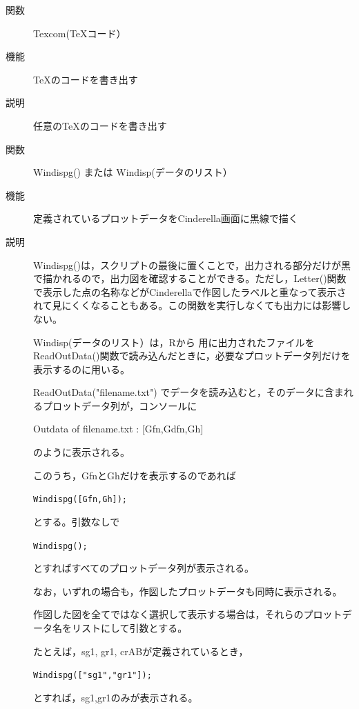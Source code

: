 \documentclass[papersize,a4paper,12pt,uplatex]{jsarticle}
\begin{document}
\begin{description}
\vspace{\baselineskip}
\hypertarget{texcom}{}
\item[関数]  Texcom(\TeX コード）
\item[機能]  \TeX のコードを書き出す
\item[説明]  任意の\TeX のコードを書き出す

\vspace{\baselineskip}
\hypertarget{windispg}{}
\item[関数]  Windispg()  または  Windisp(データのリスト）
\item[機能]  定義されているプロットデータをCinderella画面に黒線で描く
\item[説明]  Windispg()は，スクリプトの最後に置くことで，出力される部分だけが黒で描かれるので，出力図を確認することができる。ただし，Letter()関数で表示した点の名称などがCinderellaで作図したラベルと重なって表示されて見にくくなることもある。この関数を実行しなくても出力には影響しない。

Windisp(データのリスト）は，Rから \ketcindy 用に出力されたファイルを ReadOutData()関数で読み込んだときに，必要なプロットデータ列だけを表示するのに用いる。
  
ReadOutData("filename.txt") でデータを読み込むと，そのデータに含まれるプロットデータ列が，コンソールに

\hspace{10mm}Outdata of filename.txt : [Gfn,Gdfn,Gh] 

のように表示される。

このうち，GfnとGhだけを表示するのであれば

\hspace{10mm}\verb|Windispg([Gfn,Gh]);|

とする。引数なしで
 
\hspace{10mm}\verb|Windispg();|

とすればすべてのプロットデータ列が表示される。

なお，いずれの場合も，作図したプロットデータも同時に表示される。

作図した図を全てではなく選択して表示する場合は，それらのプロットデータ名をリストにして引数とする。

たとえば，sg1, gr1, crABが定義されているとき，

\hspace{10mm}\verb|Windispg(["sg1","gr1"]);|
        
とすれば，sg1,gr1のみが表示される。



\end{description}
\end{document}
